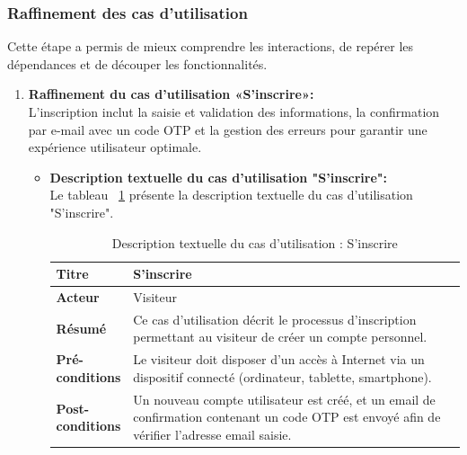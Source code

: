 \subsubsection{Raffinement des cas d’utilisation}
Cette étape a permis de mieux comprendre les interactions, de repérer les dépendances et de découper les fonctionnalités.
\begin{enumerate}[label=\alph*), left=-0.1cm]
    \item \textbf{Raffinement du cas d’utilisation «S'inscrire»:}\\
        L'inscription inclut la saisie et validation des informations, la confirmation par e-mail avec un code OTP et la gestion des erreurs pour garantir une expérience utilisateur optimale.
        \begin{itemize}[label=, left=-0.1cm]
            \item \textbf{Description textuelle du cas d’utilisation "S'inscrire":} \\
                  Le tableau ~\ref{tab:descInsc}  présente la description textuelle du cas d’utilisation "S'inscrire".
                  \begin{spacing}{1.1}
                        \begin{longtable}{|p{0.12\linewidth}|p{0.88\linewidth}|}
                            \caption{Description textuelle du cas d’utilisation : S'inscrire}
                            \label{tab:descInsc}\\
                            \hline
                            \textbf{Titre} & S'inscrire \\
                            \hline
                            \textbf{Acteur} & Visiteur \\
                            \hline
                            \textbf{Résumé} & Ce cas d'utilisation décrit le processus d'inscription permettant au visiteur de créer un compte personnel. \\
                            \hline
                            \textbf{Pré-conditions} & 
                                Le visiteur doit disposer d’un accès à Internet via un dispositif connecté (ordinateur, tablette, smartphone). \\
                            \hline
                            \textbf{Post-conditions} & 
                                Un nouveau compte utilisateur est créé, et un email de confirmation contenant un code OTP est envoyé afin de vérifier l’adresse email saisie. \\

\end{longtable}
\end{spacing}
\end{itemize}
\end{enumerate}
